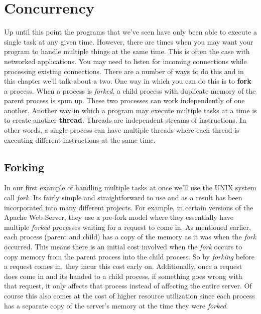 \documentclass[../main.tex]{subfiles}
\begin{document}
	\chapter{Concurrency}\label{ch:7}
	Up until this point the programs that we've seen have only been able to execute a single task at any given time.  However, there are times when you may want your program to handle multiple things at the same time.  This is often the case with networked applications.  You may need to listen for incoming connections while processing existing connections.  There are a number of ways to do this and in this chapter we'll talk about a two.  
	One way in which you can do this is to \textbf{fork} a process.  When a process is \textit{forked}, a child process with duplicate memory of the parent process is spun up.  These two processes can work independently of one another.  Another way in which a program may execute multiple tasks at a time is to create another \textbf{thread}.  Threads are independent streams of instructions.  In other words, a single process can have multiple threads where each thread is executing different instructions at the same time.
	
	\section{Forking}
	In our first example of handling multiple tasks at once we'll use the UNIX system call \textit{fork}.  Its fairly simple and straightforward to use and as a result has been incorporated into many different projects.  For example, in certain versions of the Apache Web Server, they use a pre-fork model where they essentially have multiple \textit{forked} processes waiting for a request to come in.  As mentioned earlier, each process (parent and child) has a copy of the memory as it was when the \textit{fork} occurred.  This means there is an initial cost involved when the \textit{fork} occurs to copy memory from the parent process into the child process.  So by \textit{forking} before a request comes in, they incur this cost early on.  Additionally, once a request does come in and its handed to a child process, if something goes wrong with that request, it only affects that process instead of affecting the entire server.  Of course this also comes at the cost of higher resource utilization since each process has a separate copy of the server's memory at the time they were \textit{forked}.
	
\end{document}
